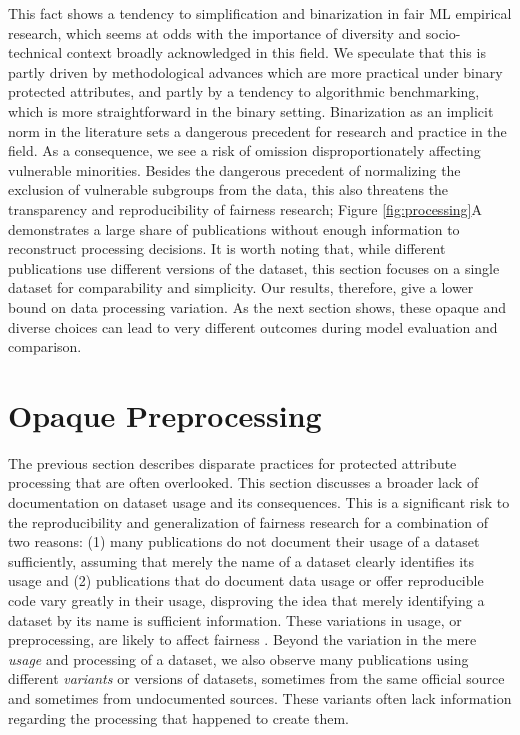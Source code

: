 This fact shows a tendency to simplification and binarization in fair ML empirical research, which seems at odds with the importance of diversity and socio-technical context broadly acknowledged in this field.  We speculate that this is partly driven by methodological advances which are more practical under binary protected attributes, and partly by a tendency to algorithmic benchmarking, which is more straightforward in the binary setting. Binarization as an implicit norm in the literature sets a dangerous precedent for research and practice in the field. As a consequence, we see a risk of omission disproportionately affecting vulnerable minorities. Besides the dangerous precedent of normalizing the exclusion of vulnerable subgroups from the data, this also threatens the transparency and reproducibility of fairness research; Figure \ref{fig:processing}A demonstrates a large share of publications without enough information to reconstruct processing decisions. It is worth noting that, while different publications use different versions of the dataset, this section focuses on a single dataset for comparability and simplicity. Our results, therefore, give a lower bound on data processing variation. As the next section shows, these opaque and diverse choices can lead to very different outcomes during model evaluation and comparison. 

\section{Opaque Preprocessing}\label{sec:opaque}

The previous section describes disparate practices for protected attribute processing that are often overlooked. This section discusses a broader lack of documentation on dataset usage and its consequences. This is a significant risk to the reproducibility and generalization of fairness research for a combination of two reasons: (1) many publications do not document their usage of a dataset sufficiently, assuming that merely the name of a dataset clearly identifies its usage and (2) publications that do document data usage or offer reproducible code vary greatly in their usage, disproving the idea that merely identifying a dataset by its name is sufficient information. These variations in usage, or preprocessing, are likely to affect fairness \citep{mougan2023fairness,simson2023everything}.
Beyond the variation in the mere \textit{usage} and processing of a dataset, we also observe many publications using different \textit{variants} or versions of datasets, sometimes from the same official source and sometimes from undocumented sources. These variants often lack information regarding the processing that happened to create them.

